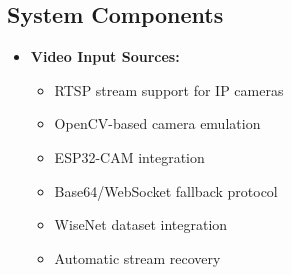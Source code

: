 \documentclass[conference]{IEEEtran}
\begin{document}
\subsection{System Components}
\begin{itemize}
      \item \textbf{Video Input Sources:}
            \begin{itemize}
                  \item RTSP stream support for IP cameras
                  \item OpenCV-based camera emulation
                  \item ESP32-CAM integration
                  \item Base64/WebSocket fallback protocol
                  \item WiseNet dataset integration
                  \item Automatic stream recovery
            \end{itemize}


\end{itemize}
\end{document}
